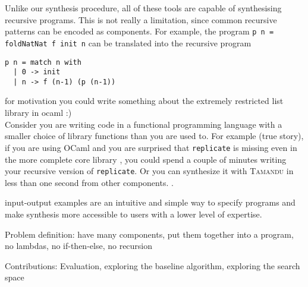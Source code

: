 Unlike our synthesis procedure, all of these tools are capable of synthesising recursive programs. This is not really a limitation, since common recursive patterns can be encoded as components. For example, the program \lstinline!p n = foldNatNat f init n! can be translated into the recursive program
\begin{lstlisting}[style=plain]
p n = match n with
  | 0 -> init
  | n -> f (n-1) (p (n-1))
\end{lstlisting}  

for motivation you could write something about the extremely restricted list library in ocaml :)\\
Consider you are writing code in a functional programming language with a smaller choice of library functions than you are used to. For example (true story), if you are using OCaml and you are surprised that \lstinline?replicate? is missing even in the more complete core library , you could spend a couple of minutes writing your recursive version of \lstinline?replicate?. Or you can synthesize it with \textsc{Tamandu} in less than one second from other components. .

input-output examples are an intuitive and simple way to specify programs and make synthesis more accessible to users with a lower level of expertise.


Problem definition: have many components, put them together into a program, no lambdas, no if-then-else, no recursion
  

  
  
Contributions: Evaluation, exploring the baseline algorithm, exploring the search space
